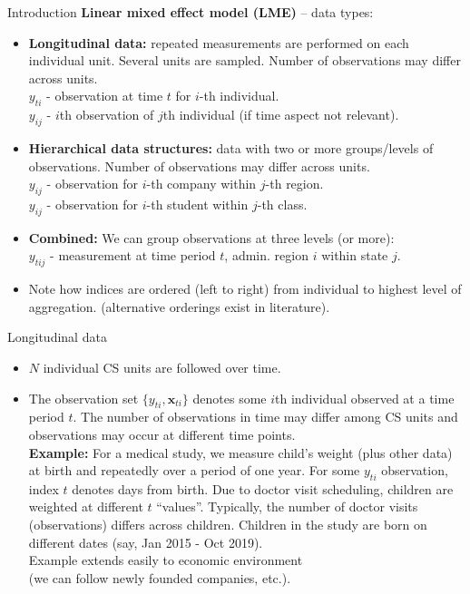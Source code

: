 \documentclass{beamer}
\begin{document}
\begin{frame}{Introduction}
\small 
\textbf{Linear mixed effect model (LME)} -- data types:
\medskip
\begin{itemize}
\item \textbf{Longitudinal data:} repeated measurements are performed on each individual  unit. Several units are sampled. Number of observations may differ across units.\\ \smallskip
\quad $y_{ti}$ - observation at time $t$ for $i$-th individual. \\  
\quad $y_{ij}$ - $i$th observation of $j$th individual (if time aspect not relevant). \\ 
\bigskip
\item \textbf{Hierarchical data structures:} data with two or more groups/levels of observations. Number of observations may differ across units.\\ \smallskip
\quad $y_{ij}$ - observation for $i$-th company within $j$-th region. \\ 
\quad $y_{ij}$ - observation for $i$-th student within $j$-th class. \\ 
\medskip
\bigskip
\item \textbf{Combined:} We can group observations at three levels (or more):\\
\smallskip
\quad $y_{tij}$ - measurement at time period $t$, admin. region $i$ within state $j$.\\ 
\bigskip
\item Note how indices are ordered (left to right) from individual to highest level of aggregation. (alternative orderings exist in literature).
\end{itemize}
\end{frame}
\begin{frame}{Longitudinal data}
\begin{itemize}
\item $N$ individual CS units are followed over time.
\medskip
\item The observation set $\{y_{ti},\bm{x}_{ti}\}$ denotes some $i$th individual  observed at a time period $t$. The number of observations in time may differ among CS units and observations may occur at different time points. \\ \medskip 
\textbf{Example:} For a medical study, we measure child's weight (plus other data) at birth and repeatedly over a period of one year. For some $y_{ti}$ observation, index $t$ denotes days from birth. Due to doctor visit scheduling, children are weighted at different $t$ ``values''. Typically, the number of doctor visits (observations) differs across children. Children in the study are born on different dates (say, Jan 2015 - Oct 2019). \\ \medskip Example extends easily to economic environment \\(we can follow newly founded companies, etc.).
\end{itemize}
\end{frame}
\end{document}

